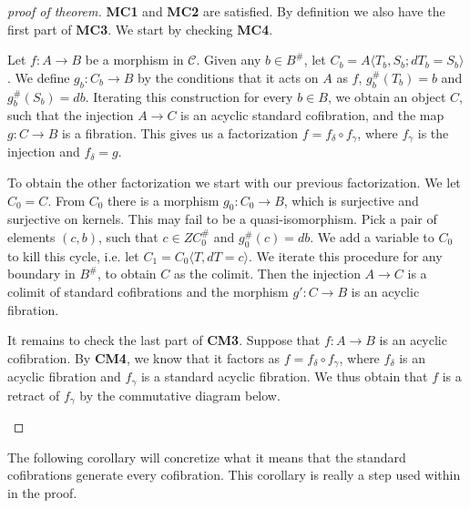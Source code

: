 \documentclass[../thesis.tex]{subfiles}
\begin{document}
            \begin{proof}[proof of theorem]
                \textbf{MC1} and \textbf{MC2} are satisfied. By definition we also have the first part of \textbf{MC3}. We start by checking \textbf{MC4}.

                Let $f:A\rightarrow B$ be a morphism in $\mathcal{C}$. Given any $b\in B^\#$, let $C_b = A\langle T_b,S_b; dT_b = S_b\rangle$. We define $g_b: C_b \rightarrow B$ by the conditions that it acts on $A$ as $f$, $g_b^\#(T_b) = b$ and $g_b^\#(S_b)=db$. Iterating this construction for every $b\in B$, we obtain an object $C$, such that the injection $A \rightarrow C$ is an acyclic standard cofibration, and the map $g : C \rightarrow B$ is a fibration. This gives us a factorization $f = f_\delta\circ f_\gamma$, where $f_\gamma$ is the injection and $f_\delta = g$.

                To obtain the other factorization we start with our previous factorization. We let $C_0 = C$. From $C_0$ there is a morphism $g_0 : C_0 \rightarrow B$, which is surjective and surjective on kernels. This may fail to be a quasi-isomorphism. Pick a pair of elements $(c,b)$, such that $c\in ZC_0^\#$ and $g_0^\#(c) = db$. We add a variable to $C_0$ to kill this cycle, i.e. let $C_1 = C_0\langle T, dT = c\rangle$. We iterate this procedure for any boundary in $B^\#$, to obtain $C$ as the colimit. Then the injection $A \rightarrow C$ is a colimit of standard cofibrations and the morphism $g' : C \rightarrow B$ is an acyclic fibration.
                
                It remains to check the last part of \textbf{CM3}. Suppose that $f:A\rightarrow B$ is an acyclic cofibration. By \textbf{CM4}, we know that it factors as $f = f_\delta \circ f_\gamma$, where $f_\delta$ is an acyclic fibration and $f_\gamma$ is a standard acyclic fibration. We thus obtain that $f$ is a retract of $f_\gamma$ by the commutative diagram below.
                \begin{center}
                \end{center}
            \end{proof}

            The following corollary will concretize what it means that the standard cofibrations generate every cofibration. This corollary is really a step used within in the proof.
\end{document}
